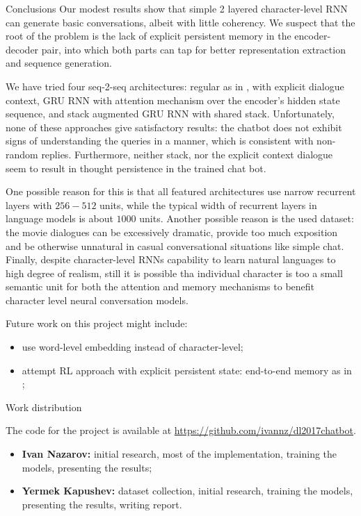\documentclass[12pt,a4paper]{article}
\begin{document}
\begin{section}{Conclusions}
Our modest results show that simple 2 layered character-level RNN can generate basic
conversations, albeit with little coherency. We suspect that the root of the problem
is the lack of explicit persistent memory in the encoder-decoder pair, into
which both parts can tap for better representation extraction and sequence generation.

We have tried four seq-2-seq architectures: regular as in \cite{2015arXiv150605869V},
with explicit dialogue context, GRU RNN with attention mechanism over the encoder's
hidden state sequence, and stack augmented GRU RNN with shared stack. Unfortunately,
none of these approaches give satisfactory results: the chatbot does not exhibit
signs of understanding the queries in a manner, which is consistent with non-random
replies. Furthermore, neither stack, nor the explicit context dialogue seem to result
in thought persistence in the trained chat bot.

One possible reason for this is that all featured architectures use narrow recurrent
layers with $256-512$ units, while the typical width of recurrent layers in language
models is about $1000$ units. Another possible reason is the used dataset: the movie
dialogues can be excessively dramatic, provide too much exposition and be otherwise
unnatural in casual conversational situations like simple chat. Finally, despite
character-level RNNs capability to learn natural languages to high degree of realism,
still it is possible tha individual character is too a small semantic unit for both
the attention and memory mechanisms to benefit character level neural conversation
models.

Future work on this project might include:
\begin{itemize}
    \item use word-level embedding instead of character-level;
    \item attempt RL approach with explicit persistent state: end-to-end memory as
    in \cite{2015arXiv150308895S};
\end{itemize}

\end{section}

\begin{section}{Work distribution}

The code for the project is available at \url{https://github.com/ivannz/dl2017chatbot}.
\begin{itemize}
    \item \textbf{Ivan Nazarov:} initial research, most of the implementation,
    training the models, presenting the results;
    \item \textbf{Yermek Kapushev:} dataset collection, initial research, training
    the models, presenting the results, writing report.
\end{itemize}

\end{section}
\end{document}

